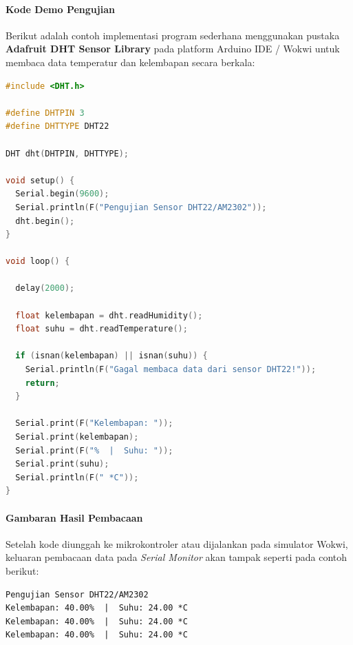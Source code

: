 \paragraph{Kode Demo Pengujian}
Berikut adalah contoh implementasi program sederhana menggunakan pustaka \textbf{Adafruit DHT Sensor Library} pada platform Arduino IDE / Wokwi untuk membaca data temperatur dan kelembapan secara berkala:

\begin{lstlisting}[language=C++, caption={Kode program pembacaan sensor DHT22 pada Arduino/ATmega2560}, label={lst:dht22_code}]
#include <DHT.h>

#define DHTPIN 3
#define DHTTYPE DHT22

DHT dht(DHTPIN, DHTTYPE);

void setup() {
  Serial.begin(9600);
  Serial.println(F("Pengujian Sensor DHT22/AM2302"));
  dht.begin();
}

void loop() {

  delay(2000);

  float kelembapan = dht.readHumidity();
  float suhu = dht.readTemperature();

  if (isnan(kelembapan) || isnan(suhu)) {
    Serial.println(F("Gagal membaca data dari sensor DHT22!"));
    return;
  }

  Serial.print(F("Kelembapan: "));
  Serial.print(kelembapan);
  Serial.print(F("%  |  Suhu: "));
  Serial.print(suhu);
  Serial.println(F(" *C"));
}
\end{lstlisting}

\paragraph{Gambaran Hasil Pembacaan}
Setelah kode diunggah ke mikrokontroler atau dijalankan pada simulator Wokwi, keluaran pembacaan data pada \textit{Serial Monitor} akan tampak seperti pada contoh berikut:

\begin{verbatim}
Pengujian Sensor DHT22/AM2302
Kelembapan: 40.00%  |  Suhu: 24.00 *C
Kelembapan: 40.00%  |  Suhu: 24.00 *C
Kelembapan: 40.00%  |  Suhu: 24.00 *C
\end{verbatim}
